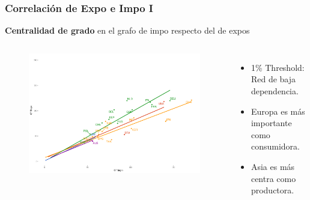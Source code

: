 \documentclass[professionalfont,fleqn]{beamer}
\begin{document}
		
	\begin{frame}
		\frametitle{Correlación de Expo e Impo I}
		
		
		\textbf{Centralidad de grado} en el grafo de impo respecto del de expos
		\begin{columns}[c] %
		\begin{flushleft}
			\begin{figure}
				\includegraphics[width=\linewidth]{corr_grados_2011_1_pcnt}
			\end{figure}
		\end{flushleft}
		
		
		\begin{itemize}
			\item 1\% Threshold: Red de baja dependencia.
			\item Europa es más importante como consumidora.
			\item Asia es más centra como productora.
		\end{itemize}
		\end{columns}
	\end{frame}
\end{document}
